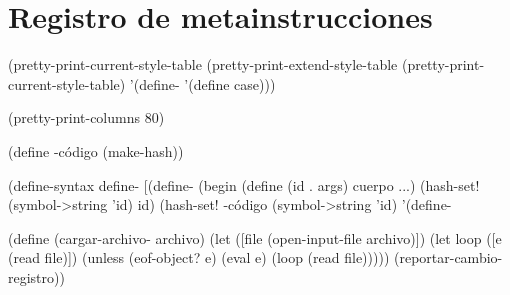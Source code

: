 \documentclass[letterpaper, twoside, openright, 11pt]{book}%
\begin{document}
{{{{{{{{{{\section{Registro de metainstrucciones}


\nwenddocs{}\endmoddef\nwstartdeflinemarkup{}\nwenddeflinemarkup
(pretty-print-current-style-table
 (pretty-print-extend-style-table (pretty-print-current-style-table)
                                  '(define-
                                  '(define case)))

(pretty-print-columns 80)

(define -código (make-hash))

(define-syntax define-
    [(define-
     (begin (define (id . args) cuerpo ...)
            (hash-set! 
                       (symbol->string 'id)
                       id)
            (hash-set! -código
                       (symbol->string 'id)
                       '(define-\nwlinkedidentc{ (id . args) cuerpo ...)))]))}{NW1Xx3lK-1bbM6I-2}

(define (cargar-archivo- archivo)
  (let ([file (open-input-file archivo)])
    (let loop ([e (read file)])
      (unless (eof-object? e)
        (eval e)
        (loop (read file)))))
  (reportar-cambio-registro))

}}}}}}}}}}
\end{document}
